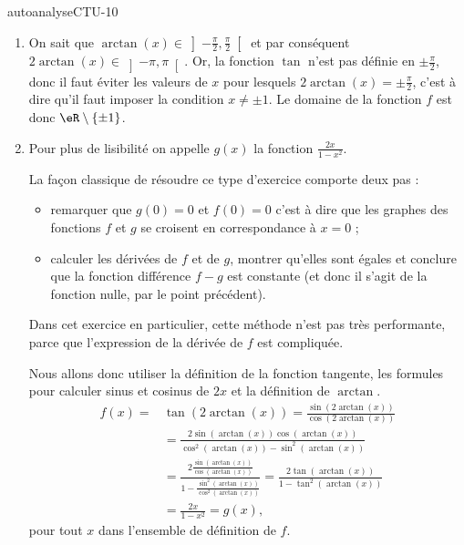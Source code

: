 
\begin{corrige}{autoanalyseCTU-10}

\begin{enumerate}
\item On sait que $\arctan(x)\in\left]-\frac{\pi}{2},\frac{\pi}{2}\right[$ et par conséquent $2\arctan(x)\in\left]-\pi, \pi\right[$. Or, la fonction $\tan$ n'est pas définie en $\pm\frac{\pi}{2}$, donc il faut éviter les valeurs de $x$ pour lesquels $2\arctan(x)=\pm\frac{\pi}{2}$, c'est à dire qu'il faut imposer la condition $x\neq \pm 1$. Le domaine de la fonction $f$ est donc $\eR\setminus\{\pm 1\}$.
\item Pour plus de lisibilité on appelle $g(x)$ la fonction  $\frac{2x}{1-x^2}$. 

La façon classique de résoudre ce type d'exercice comporte deux pas : 
\begin{itemize}
\item remarquer que $g(0) = 0$ et $f(0) = 0$ c'est à dire que les graphes des fonctions $f$ et $g$ se croisent en correspondance à $x= 0$ ; 
\item  calculer les dérivées de $f$ et de $g$, montrer qu'elles sont égales et conclure que la fonction différence $f-g$ est constante (et donc il s'agit de la fonction nulle, par le point précédent).
\end{itemize}
Dans cet exercice en particulier, cette méthode n'est pas très performante, parce que l'expression de la dérivée de $f$ est compliquée. 

Nous allons donc utiliser la définition de la fonction tangente, les formules pour calculer sinus et cosinus de $2x$ et la définition de $\arctan$. 
\begin{equation*}
  \begin{aligned}
    f(x)=& \tan(2 \arctan (x)) = \frac{\sin(2 \arctan (x))}{\cos(2 \arctan (x))} \\
    &= \frac{2\sin(\arctan (x))\cos(\arctan (x))}{\cos^2(\arctan (x))-\sin^2(\arctan (x))}\\
    &=\frac{2\frac{\sin(\arctan (x))}{\cos(\arctan (x))}}{1-\frac{\sin^2(\arctan (x))}{\cos^2(\arctan (x))}} = \frac{2\tan(\arctan (x))}{1-\tan^2(\arctan (x))}\\
    &= \frac{2x}{1-x^2} = g(x),
  \end{aligned}
\end{equation*}
pour tout $x$ dans l'ensemble de définition de $f$.
\end{enumerate}


\end{corrige}   
